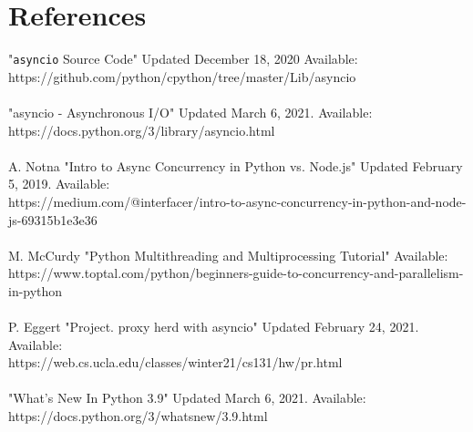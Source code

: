 \section{References}
"\texttt{asyncio} Source Code"
Updated December 18, 2020
Available: \\ https://github.com/python/cpython/tree/master/Lib/asyncio \\
\\
"asyncio - Asynchronous I/O" 
Updated March 6, 2021.
Available: \\ https://docs.python.org/3/library/asyncio.html \\
\\
A. Notna "Intro to Async Concurrency in Python vs. Node.js"
Updated February 5, 2019.
Available: \\ https://medium.com/@interfacer/intro-to-async-concurrency-in-python-and-node-js-69315b1e3e36 \\
\\
M. McCurdy "Python Multithreading and Multiprocessing Tutorial"
Available: \\ https://www.toptal.com/python/beginners-guide-to-concurrency-and-parallelism-in-python \\
\\
P. Eggert "Project. proxy herd with asyncio" 
Updated February 24, 2021. 
Available: \\ https://web.cs.ucla.edu/classes/winter21/cs131/hw/pr.html \\
\\
"What's New In Python 3.9"
Updated March 6, 2021.
Available: \\ https://docs.python.org/3/whatsnew/3.9.html





